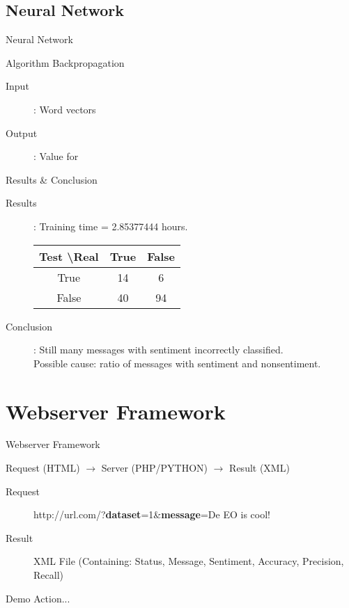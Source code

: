 \documentclass{beamer}
\begin{document}
\subsection{Neural Network}
\begin{frame}{Neural Network}
\begin{block}{Algorithm}
Backpropagation
\end{block}
\begin{description}
\item[Input]: Word vectors
\item[Output]: Value for 
\end{description}
\end{frame}
\begin{frame}{Results \& Conclusion}
\begin{description}
\item[Results]: Training time = 2.85377444 hours.\\
\begin{tabular}{c || c | c}\\
Test \textbackslash Real & True & False \\
\hline
True & 14 & 6 \\
False & 40 & 94 \\
\end{tabular}

\item[Conclusion]: Still many messages with sentiment incorrectly classified. \\Possible cause: ratio of messages with sentiment and nonsentiment.
\end{description}
\end{frame}

\section{Webserver Framework}
\begin{frame}{Webserver Framework}
\begin{center}
Request (HTML) $\rightarrow$ Server (PHP/PYTHON) $\rightarrow$ Result (XML)
\end{center}

\begin{description}
\item[Request] http://url.com/?\textbf{dataset}=1\&\textbf{message}=De EO is cool!\\
\item[Result] XML File (Containing: Status, Message, Sentiment, Accuracy, Precision, Recall)
\end{description}
\end{frame}
\begin{frame}{Demo}
Action...
\end{frame}
\end{document}
